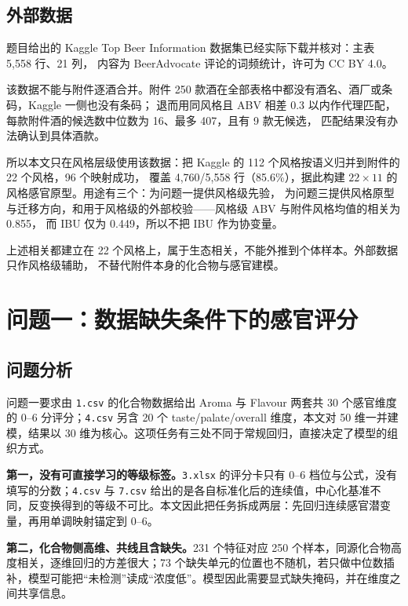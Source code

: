 ﻿\documentclass[UTF8,a4paper,zihao=-4]{ctexart}
\numberwithin{figure}{section}
\numberwithin{table}{section}
\numberwithin{equation}{section}
\newcommand{\file}[1]{\texttt{#1}}
\begin{document}
\subsection{外部数据}

题目给出的 Kaggle Top Beer Information 数据集\cite{polozoff}已经实际下载并核对：主表 5,558 行、21 列，
内容为 BeerAdvocate 评论的词频统计，许可为 CC BY 4.0。

该数据不能与附件逐酒合并。附件 250 款酒在全部表格中都没有酒名、酒厂或条码，Kaggle 一侧也没有条码；
退而用同风格且 ABV 相差 0.3 以内作代理匹配，每款附件酒的候选数中位数为 16、最多 407，且有 9 款无候选，
匹配结果没有办法确认到具体酒款。

所以本文只在风格层级使用该数据：把 Kaggle 的 112 个风格按语义归并到附件的 22 个风格，96 个映射成功，
覆盖 4,760/5,558 行（85.6\%），据此构建 $22\times11$ 的风格感官原型。用途有三个：为问题一提供风格级先验，
为问题三提供风格原型与迁移方向，和用于风格级的外部校验——风格级 ABV 与附件风格均值的相关为 0.855，
而 IBU 仅为 0.449，所以不把 IBU 作为协变量。

上述相关都建立在 22 个风格上，属于生态相关，不能外推到个体样本。外部数据只作风格级辅助，
不替代附件本身的化合物与感官建模。

\section{问题一：数据缺失条件下的感官评分}
\label{sec:q1}

\subsection{问题分析}

问题一要求由 \file{1.csv} 的化合物数据给出 Aroma 与 Flavour 两套共 30 个感官维度的 0--6 分评分；\file{4.csv} 另含 20 个 taste/palate/overall 维度，本文对 50 维一并建模，结果以 30 维为核心。这项任务有三处不同于常规回归，直接决定了模型的组织方式。

\textbf{第一，没有可直接学习的等级标签。}\file{3.xlsx} 的评分卡只有 0--6 档位与公式，没有填写的分数；\file{4.csv} 与 \file{7.csv} 给出的是各自标准化后的连续值，中心化基准不同，反变换得到的等级不可比。本文因此把任务拆成两层：先回归连续感官潜变量，再用单调映射锚定到 0--6。

\textbf{第二，化合物侧高维、共线且含缺失。}231 个特征对应 250 个样本，同源化合物高度相关，逐维回归的方差很大；73 个缺失单元的位置也不随机，若只做中位数插补，模型可能把“未检测”读成“浓度低”。模型因此需要显式缺失掩码，并在维度之间共享信息。
\end{document}
